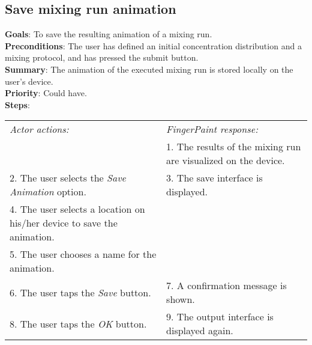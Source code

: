 \begin{appendices}
  \section{Save mixing run animation}
   \label{savemixanim}
  \textbf{Goals}: To save the resulting animation of a mixing run.\\
  \textbf{Preconditions}: The user has defined an initial concentration distribution and a mixing protocol, and has pressed the submit button.\\
  \textbf{Summary}: The animation of the executed mixing run is stored locally on the user's device.\\
  \textbf{Priority}: Could have.\\
  \textbf{Steps}: \\
  \begin{tabular}{ p{} p{} }
  	\emph{Actor actions:} & \emph{FingerPaint response:} \\
	   & 1. The results of the mixing run are visualized on the device. \\
	 2. The user selects the \emph{Save Animation} option. & 3. The save interface is displayed.\\
	 4. The user selects a location on his/her device to save the animation. & \\
	 5. The user chooses a name for the animation. & \\
	 6. The user taps the \emph{Save} button. & 7. A confirmation message is shown. \\
	 8. The user taps the \emph{OK} button. & 9. The output interface is displayed again. \\
  \end{tabular}


\end{appendices}
